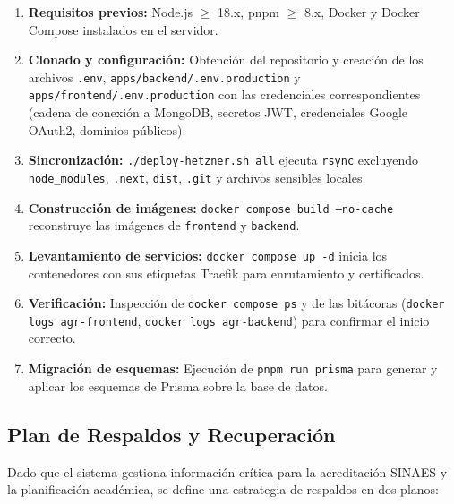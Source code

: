 \begin{enumerate}
    \item \textbf{Requisitos previos:} Node.js $\geq$ 18.x, pnpm $\geq$ 8.x, Docker y Docker Compose instalados en el servidor.
    \item \textbf{Clonado y configuración:} Obtención del repositorio y creación de los archivos \texttt{.env}, \texttt{apps/backend/.env.production} y \texttt{apps/frontend/.env.production} con las credenciales correspondientes (cadena de conexión a MongoDB, secretos JWT, credenciales Google OAuth2, dominios públicos).
    \item \textbf{Sincronización:} \texttt{./deploy-hetzner.sh all} ejecuta \texttt{rsync} excluyendo \texttt{node\_modules}, \texttt{.next}, \texttt{dist}, \texttt{.git} y archivos sensibles locales.
    \item \textbf{Construcción de imágenes:} \texttt{docker compose build --no-cache} reconstruye las imágenes de \texttt{frontend} y \texttt{backend}.
    \item \textbf{Levantamiento de servicios:} \texttt{docker compose up -d} inicia los contenedores con sus etiquetas Traefik para enrutamiento y certificados.
    \item \textbf{Verificación:} Inspección de \texttt{docker compose ps} y de las bitácoras (\texttt{docker logs agr-frontend}, \texttt{docker logs agr-backend}) para confirmar el inicio correcto.
    \item \textbf{Migración de esquemas:} Ejecución de \texttt{pnpm run prisma} para generar y aplicar los esquemas de Prisma sobre la base de datos.
\end{enumerate}

\subsection{Plan de Respaldos y Recuperación}

Dado que el sistema gestiona información crítica para la acreditación SINAES y la planificación académica, se define una estrategia de respaldos en dos planos:


